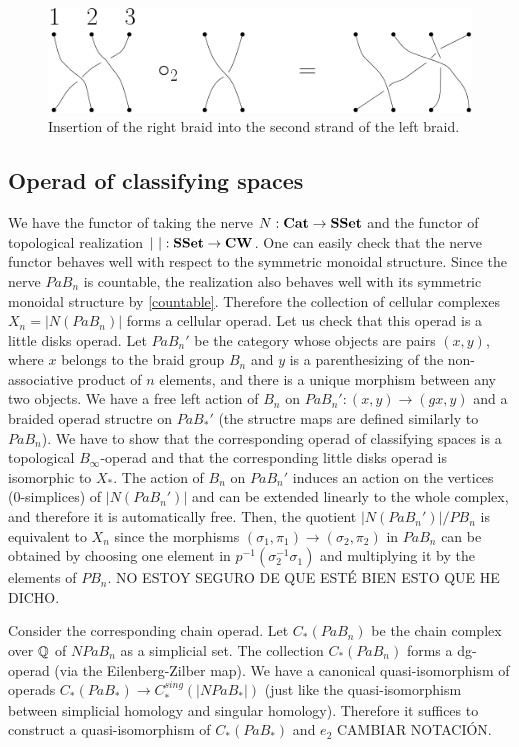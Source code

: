 \documentclass[TFM.tex]{subfiles}
\begin{document}
\begin{figure}[h!]
\includegraphics[scale=0.7]{Imagenes/insercion.png}
\caption{Insertion of the right braid into the second strand of the left braid.}
\end{figure}

\subsection{Operad of classifying spaces}

We have the functor of taking the nerve $N:\mathrm{\mathbf{Cat}}\to\mathrm{\mathbf{SSet}}$ and the functor of topological realization $|\ |:\mathrm{\mathbf{SSet}}\to \mathrm{\mathbf{CW}}$. One can easily check that the nerve functor behaves well with respect to the symmetric monoidal structure. Since the nerve $PaB_n$ is countable, the realization also behaves well with its symmetric monoidal structure by \ref{countable}. Therefore the collection of cellular complexes $X_n=|N(PaB_n)|$ forms a cellular operad. Let us check that this operad is a little disks operad. Let $PaB_n'$ be the category whose objects are pairs $(x,y)$, where $x$ belongs to the braid group $B_n$ and $y$ is a parenthesizing of the non-associative product of $n$ elements, and there is a unique morphism between any two objects. We have a free left action of $B_n$ on $PaB_n':(x,y)\to (gx,y)$ and a braided operad structre on $PaB_*'$ (the structre maps are defined similarly to $PaB_n$). We have to show that the corresponding operad of classifying spaces is a topological $B_\infty$-operad and that the corresponding little disks operad is isomorphic to $X_*$. The action of $B_n$ on $PaB_n'$ induces an action on the vertices (0-simplices) of $|N(PaB_n')|$ and can be extended linearly to the whole complex, and therefore it is automatically free. Then, the quotient $|N(PaB_n')|/PB_n$ is equivalent to $X_n$ since the morphisms $(\sigma_1,\pi_1)\to(\sigma_2,\pi_2)$ in $PaB_n$ can be obtained by choosing one element in $p^{-1}(\sigma_2^{-1}\sigma_1)$ and multiplying it by the elements of $PB_n$. NO ESTOY SEGURO DE QUE ESTÉ BIEN ESTO QUE HE DICHO.

Consider the corresponding chain operad. Let $C_*(PaB_n)$ be the chain complex over $\mathbb{Q}$ of $NPaB_n$ as a simplicial set. The collection $C_*(PaB_n)$ forms a dg-operad (via the Eilenberg-Zilber map). We have a canonical quasi-isomorphism of operads $C_*(PaB_*)\to C_*^{sing}(|NPaB_*|)$ (just like the quasi-isomorphism between simplicial homology and singular homology). Therefore it suffices to construct a quasi-isomorphism of $C_*(PaB_*)$ and $e_2$ CAMBIAR NOTACIÓN.
\end{document}
